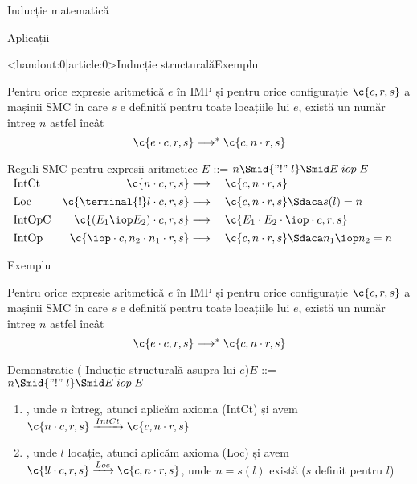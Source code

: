 \begin{section}{Inducție matematică}
\begin{subsection}{Aplicații}
\begin{frame}<handout:0|article:0>{Inducție structurală}{Exemplu}
\begin{theorem}
Pentru orice expresie aritmetică $e$ în IMP și pentru  orice configurație $\c{c,r,s}$ a mașinii SMC în care $s$ e definită pentru toate locațiile lui $e$, există un număr întreg $n$ astfel încât 
$$\c{e\cdot c,  r, s} \longrightarrow^\ast \c{c, n\cdot r, s}$$
\end{theorem}
\begin{block}{Reguli SMC pentru expresii aritmetice $E$ ::= $n \Smid {\mathrel{"!"} l} \Smid E \mathrel{iop} E$}
$\begin{array}{l@{\extracolsep{1em}}r@{{}\longrightarrow{}}l}
\mbox{IntCt}&
\c{n\cdot c,r,s} & \c{c, n \cdot r, s}
\\[1ex]
\mbox{Loc}&
\c{\terminal{!} l\cdot c,r,s} & \c{c, n \cdot r, s}  \Sdaca s(l) = n
\\[1ex]
\mbox{IntOpC}&
\c{(E_1 \iop E_2) \cdot c, r, s} & \c{E_1 \cdot E_2 \cdot \iop \cdot c, r, s}
\\[1ex]
\mbox{IntOp}&
\c{\iop \cdot c, n_2\cdot n_1 \cdot r, s} & \c{c, n \cdot r, s} \Sdaca n_1 \iop n_2 = n
\end{array}$
\end{block}
\end{frame}

\begin{frame}{}{Exemplu}
  \setcounter{theorem}{0}
\begin{theorem}
Pentru orice expresie aritmetică $e$ în IMP și pentru  orice configurație $\c{c,r,s}$ a mașinii SMC în care $s$ e definită pentru toate locațiile lui $e$, există un număr întreg $n$ astfel încât 
$$\c{e\cdot c,  r, s} \longrightarrow^\ast \c{c, n\cdot r, s}$$
\end{theorem}

\begin{block}{Demonstrație (%
Inducție structurală asupra  lui $e$)\hfill  $E$ ::= $n \Smid {\mathrel{"!"} l} \Smid E \mathrel{iop} E$}
\begin{enumerate}
\item {}, unde $n$ întreg, atunci aplicăm axioma (IntCt) și avem 
$\c{n\cdot c,  r, s} \xrightarrow{IntCt} \c{c, n\cdot r, s}$
\item {}, unde $l$ locație, atunci aplicăm axioma (Loc) și avem 
$\c{! l\cdot c,  r, s} \xrightarrow{Loc} \c{c, n\cdot r, s}$, unde $n=s(l)$ există  ($s$ definit pentru $l$)
\end{enumerate}
\end{block}
\end{frame}


\end{subsection}
\end{section}
